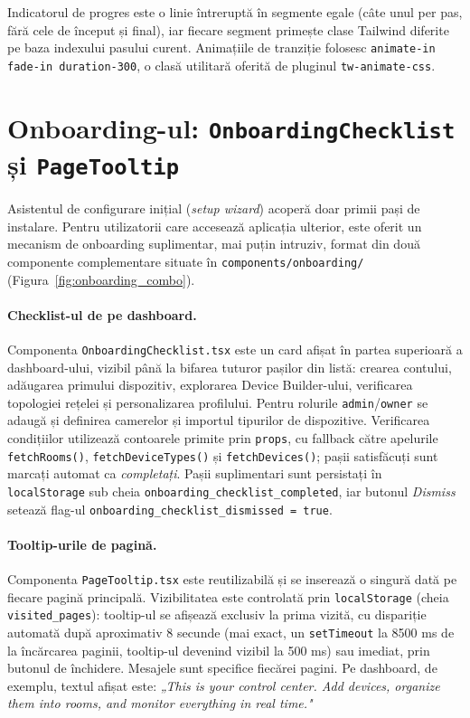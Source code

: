 Indicatorul de progres este o linie întreruptă în segmente egale (câte unul per pas, fără cele de început și final), iar fiecare segment primește clase Tailwind diferite pe baza indexului pasului curent. Animațiile de tranziție folosesc \texttt{animate-in fade-in duration-300}, o clasă utilitară oferită de pluginul \texttt{tw-animate-css}.

\section{Onboarding-ul: \texttt{OnboardingChecklist} și \texttt{PageTooltip}}
Asistentul de configurare inițial (\emph{setup wizard}) acoperă doar primii pași de instalare. Pentru utilizatorii care accesează aplicația ulterior, este oferit un mecanism de onboarding suplimentar, mai puțin intruziv, format din două componente complementare situate în \texttt{components/onboarding/} (Figura~\ref{fig:onboarding_combo}).

\paragraph{Checklist-ul de pe dashboard.} Componenta \texttt{OnboardingChecklist.tsx} este un card afișat în partea superioară a dashboard-ului, vizibil până la bifarea tuturor pașilor din listă: crearea contului, adăugarea primului dispozitiv, explorarea Device Builder-ului, verificarea topologiei rețelei și personalizarea profilului. Pentru rolurile \texttt{admin}/\texttt{owner} se adaugă și definirea camerelor și importul tipurilor de dispozitive. Verificarea condițiilor utilizează contoarele primite prin \texttt{props}, cu fallback către apelurile \texttt{fetchRooms()}, \texttt{fetchDeviceTypes()} și \texttt{fetchDevices()}; pașii satisfăcuți sunt marcați automat ca \emph{completați}. Pașii suplimentari sunt persistați în \texttt{localStorage} sub cheia \texttt{onboarding\_checklist\_completed}, iar butonul \emph{Dismiss} setează flag-ul \texttt{onboarding\_checklist\_dismissed = true}.

\paragraph{Tooltip-urile de pagină.} Componenta \texttt{PageTooltip.tsx} este reutilizabilă și se inserează o singură dată pe fiecare pagină principală. Vizibilitatea este controlată prin \texttt{localStorage} (cheia \texttt{visited\_pages}): tooltip-ul se afișează exclusiv la prima vizită, cu dispariție automată după aproximativ 8 secunde (mai exact, un \texttt{setTimeout} la 8500 ms de la încărcarea paginii, tooltip-ul devenind vizibil la 500 ms) sau imediat, prin butonul de închidere. Mesajele sunt specifice fiecărei pagini. Pe dashboard, de exemplu, textul afișat este: \emph{„This is your control center. Add devices, organize them into rooms, and monitor everything in real time."}

